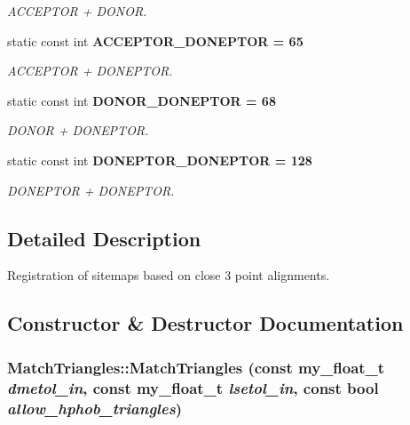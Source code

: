 \begin{CompactItemize}
\begin{CompactList}\small\item\em ACCEPTOR + DONOR. \item\end{CompactList}\item 
static const int \bf{ACCEPTOR\_\-DONEPTOR} = 65\label{classASCbase_1_1MatchTriangles_4c4b4779b05e824be2960a0a6ba525f8}

\begin{CompactList}\small\item\em ACCEPTOR + DONEPTOR. \item\end{CompactList}\item 
static const int \bf{DONOR\_\-DONEPTOR} = 68\label{classASCbase_1_1MatchTriangles_7816e470f2da8b31bfe68f635a84870f}

\begin{CompactList}\small\item\em DONOR + DONEPTOR. \item\end{CompactList}\item 
static const int \bf{DONEPTOR\_\-DONEPTOR} = 128\label{classASCbase_1_1MatchTriangles_152f1eff01e619c50b2361c394330a63}

\begin{CompactList}\small\item\em DONEPTOR + DONEPTOR. \item\end{CompactList}\end{CompactItemize}


\subsection{Detailed Description}
Registration of sitemaps based on close 3 point alignments. 



\subsection{Constructor \& Destructor Documentation}
\subsubsection{\setlength{\rightskip}{0pt plus 5cm}Match\-Triangles::Match\-Triangles (const my\_\-float\_\-t {\em dmetol\_\-in}, const my\_\-float\_\-t {\em lsetol\_\-in}, const bool {\em allow\_\-hphob\_\-triangles})}\label{classASCbase_1_1MatchTriangles_29b1ab95b85c05e891ecbdc6700e5926}


